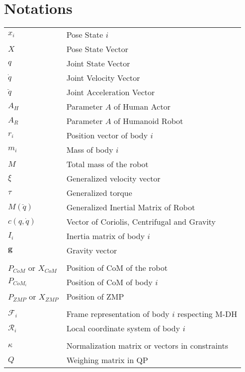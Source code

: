 \documentclass{thesisreport}
\begin{document}
\section*{Notations}
    \begin{tabular}{p{3cm}p{10cm}}
        $x_i$ & Pose State $i$ \\
        $X$ & Pose State Vector \\
        $q$ & Joint State Vector \\
        $\dot{q}$ & Joint Velocity Vector \\
        $\ddot{q}$ & Joint Acceleration Vector \\
        $A_H$ & Parameter $A$ of Human Actor \\
        $A_R$ & Parameter $A$ of Humanoid Robot \\
        $r_i$ & Position vector of body $i$ \\
        $m_i$ & Mass of body $i$ \\
        $M$ & Total mass of the robot \\
        $\xi$ & Generalized velocity vector \\
        $\tau$ & Generalized torque \\
        $M(\ddot{q})$ & Generalized Inertial Matrix of Robot \\
        $c(q, \dot{q})$ & Vector of Coriolis, Centrifugal and Gravity \\
        $I_i$ & Inertia matrix of body $i$ \\
        $\mathbf{g}$ & Gravity vector \\
         & \\
        $P_{CoM}$ or $X_{CoM}$ & Position of CoM of the robot \\
        $P_{CoM_i}$ & Position of CoM of body $i$ \\
        $P_{ZMP}$ or $X_{ZMP}$ & Position of ZMP \\

        & \\

        $\mathcal{F}_i$ & Frame representation of body $i$ respecting M-DH \\
        $\mathcal{R}_i$ & Local coordinate system of body $i$ \\
        
        & \\
        $\kappa$ & Normalization matrix or vectors in constraints \\
        $Q$ & Weighing matrix in QP \\

    \end{tabular}
\end{document}
